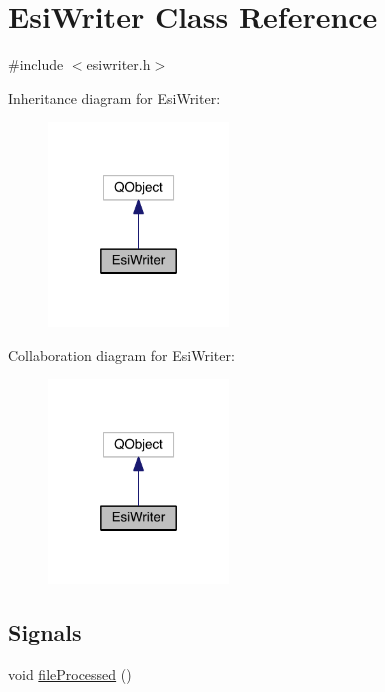 \hypertarget{class_esi_writer}{}\section{Esi\+Writer Class Reference}
\label{class_esi_writer}


{\ttfamily \#include $<$esiwriter.\+h$>$}



Inheritance diagram for Esi\+Writer\+:
\nopagebreak
\begin{figure}[H]
\begin{center}
\leavevmode
\includegraphics[width=136pt]{class_esi_writer__inherit__graph}
\end{center}
\end{figure}


Collaboration diagram for Esi\+Writer\+:
\nopagebreak
\begin{figure}[H]
\begin{center}
\leavevmode
\includegraphics[width=136pt]{class_esi_writer__coll__graph}
\end{center}
\end{figure}
\subsection*{Signals}
\begin{DoxyCompactItemize}
\item 
void \hyperlink{class_esi_writer_a5761a75e40cdd764e9f6f4384db9691f}{file\+Processed} ()
\end{DoxyCompactItemize}
